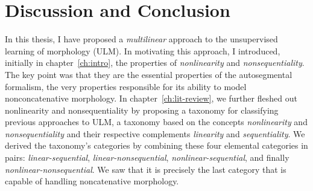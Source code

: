 \chapter{Discussion and Conclusion}
\label{ch:conclusion}

In this thesis, I have proposed a \emph{multilinear} approach to the unsupervised learning of morphology (ULM).
In motivating this approach, I introduced, initially in chapter~\ref{ch:intro}, the properties of \emph{nonlinearity} 
and \emph{nonsequentiality}. The key point was that they are the 
essential properties of the autosegmental formalism, the very properties responsible for its
ability to model nonconcatenative morphology. 
In chapter~\ref{ch:lit-review}, we further fleshed out nonlinearity and nonsequentiality
by proposing a taxonomy for classifying previous approaches to ULM, 
a taxonomy based on the concepts \emph{nonlinearity} 
and \emph{nonsequentiality} and their respective complements \emph{linearity}  and \emph{sequentiality}. We  derived the taxonomy's categories by combining these four elemental categories in pairs:
\emph{linear-sequential}, \emph{linear-nonsequential}, \emph{nonlinear-sequential}, 
and finally \emph{nonlinear-nonsequential}. 
We saw that it is precisely the last category that is capable of handling
noncatenative morphology. 


